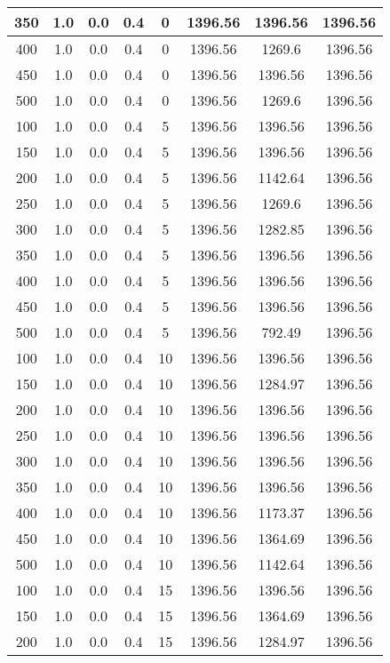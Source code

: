 \documentclass[a4paper, 12pt]{extreport}
\begin{document}
\begin{itemize}
\begin{longtable}{|c|c|c|c|c|c|c|c|}
			350 & 1.0 & 0.0 & 0.4 & 0 & 1396.56 & 1396.56 & 1396.56 \\\hline
			400 & 1.0 & 0.0 & 0.4 & 0 & 1396.56 & 1269.6 & 1396.56 \\\hline
			450 & 1.0 & 0.0 & 0.4 & 0 & 1396.56 & 1396.56 & 1396.56 \\\hline
			500 & 1.0 & 0.0 & 0.4 & 0 & 1396.56 & 1269.6 & 1396.56 \\\hline
			100 & 1.0 & 0.0 & 0.4 & 5 & 1396.56 & 1396.56 & 1396.56 \\\hline
			150 & 1.0 & 0.0 & 0.4 & 5 & 1396.56 & 1396.56 & 1396.56 \\\hline
			200 & 1.0 & 0.0 & 0.4 & 5 & 1396.56 & 1142.64 & 1396.56 \\\hline
			250 & 1.0 & 0.0 & 0.4 & 5 & 1396.56 & 1269.6 & 1396.56 \\\hline
			300 & 1.0 & 0.0 & 0.4 & 5 & 1396.56 & 1282.85 & 1396.56 \\\hline
			350 & 1.0 & 0.0 & 0.4 & 5 & 1396.56 & 1396.56 & 1396.56 \\\hline
			400 & 1.0 & 0.0 & 0.4 & 5 & 1396.56 & 1396.56 & 1396.56 \\\hline
			450 & 1.0 & 0.0 & 0.4 & 5 & 1396.56 & 1396.56 & 1396.56 \\\hline
			500 & 1.0 & 0.0 & 0.4 & 5 & 1396.56 & 792.49 & 1396.56 \\\hline
			100 & 1.0 & 0.0 & 0.4 & 10 & 1396.56 & 1396.56 & 1396.56 \\\hline
			150 & 1.0 & 0.0 & 0.4 & 10 & 1396.56 & 1284.97 & 1396.56 \\\hline
			200 & 1.0 & 0.0 & 0.4 & 10 & 1396.56 & 1396.56 & 1396.56 \\\hline
			250 & 1.0 & 0.0 & 0.4 & 10 & 1396.56 & 1396.56 & 1396.56 \\\hline
			300 & 1.0 & 0.0 & 0.4 & 10 & 1396.56 & 1396.56 & 1396.56 \\\hline
			350 & 1.0 & 0.0 & 0.4 & 10 & 1396.56 & 1396.56 & 1396.56 \\\hline
			400 & 1.0 & 0.0 & 0.4 & 10 & 1396.56 & 1173.37 & 1396.56 \\\hline
			450 & 1.0 & 0.0 & 0.4 & 10 & 1396.56 & 1364.69 & 1396.56 \\\hline
			500 & 1.0 & 0.0 & 0.4 & 10 & 1396.56 & 1142.64 & 1396.56 \\\hline
			100 & 1.0 & 0.0 & 0.4 & 15 & 1396.56 & 1396.56 & 1396.56 \\\hline
			150 & 1.0 & 0.0 & 0.4 & 15 & 1396.56 & 1364.69 & 1396.56 \\\hline
			200 & 1.0 & 0.0 & 0.4 & 15 & 1396.56 & 1284.97 & 1396.56 \\\hline

\end{longtable}
\end{itemize}
\end{document}
